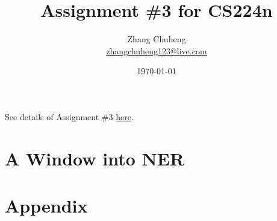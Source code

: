 \documentclass[ENG]{Sketch}
\title{Assignment \#3 for CS224n}
\author{Zhang Chuheng \\ \href{mailto:zhangchuheng123@live.com}{zhangchuheng123@live.com}}
\date{\today}
\begin{document}
  
\maketitle 

See details of Assignment \#3 \href{http://web.stanford.edu/class/cs224n/assignment3/index.html}{here}.

\section{A Window into NER}



\section{Appendix}


\end{document}
